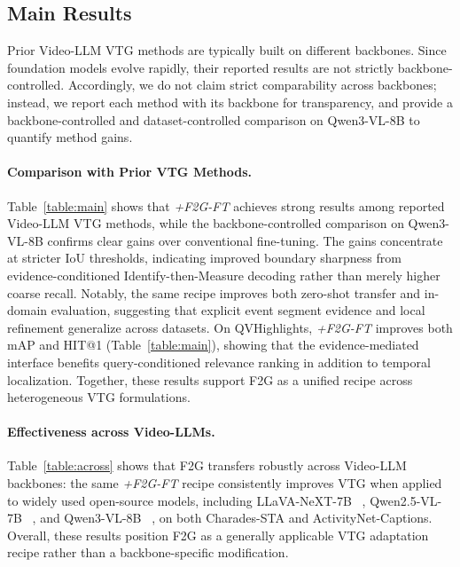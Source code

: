 \documentclass{article}
\theoremstyle{plain}
\theoremstyle{definition}
\theoremstyle{remark}
\begin{document}
\subsection{Main Results}

Prior Video-LLM VTG methods are typically built on different backbones. Since foundation models evolve rapidly, their reported results are not strictly backbone-controlled.
Accordingly, we do not claim strict comparability across backbones; instead, we report each method with its backbone for transparency, and provide a backbone-controlled and dataset-controlled comparison on Qwen3-VL-8B to quantify method gains.

\paragraph{Comparison with Prior VTG Methods.}
Table~\ref{table:main} shows that \textit{+F2G-FT} achieves strong results among reported Video-LLM VTG methods, while the backbone-controlled comparison on Qwen3-VL-8B confirms clear gains over conventional fine-tuning.
The gains concentrate at stricter IoU thresholds, indicating improved boundary sharpness from evidence-conditioned Identify-then-Measure decoding rather than merely higher coarse recall.
Notably, the same recipe improves both zero-shot transfer and in-domain evaluation, suggesting that explicit event segment evidence and local refinement generalize across datasets.
On QVHighlights, \textit{+F2G-FT} improves both mAP and HIT@1 (Table~\ref{table:main}), showing that the evidence-mediated interface benefits query-conditioned relevance ranking in addition to temporal localization.
Together, these results support F2G as a unified recipe across heterogeneous VTG formulations.

\paragraph{Effectiveness across Video-LLMs.}
Table~\ref{table:across} shows that F2G transfers robustly across Video-LLM backbones: the same \textit{+F2G-FT} recipe consistently improves VTG when applied to widely used open-source models, including LLaVA-NeXT-7B ~\cite{llava-next}, Qwen2.5-VL-7B ~\cite{Qwen2.5-VL}, and Qwen3-VL-8B ~\cite{Qwen3-VL}, on both Charades-STA and ActivityNet-Captions.
Overall, these results position F2G as a generally applicable VTG adaptation recipe rather than a backbone-specific modification.
\end{document}
